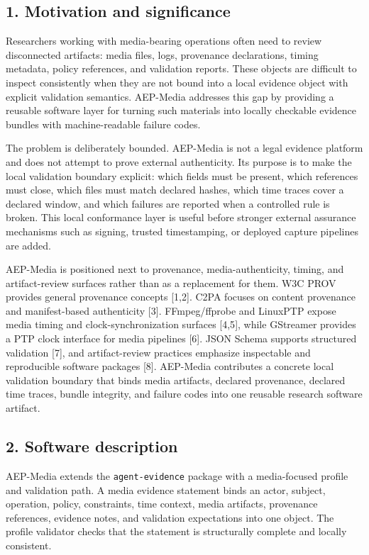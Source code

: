 \documentclass[
]{article}
\begin{document}
\subsection{1. Motivation and
significance}\label{motivation-and-significance}

Researchers working with media-bearing operations often need to review
disconnected artifacts: media files, logs, provenance declarations,
timing metadata, policy references, and validation reports. These
objects are difficult to inspect consistently when they are not bound
into a local evidence object with explicit validation semantics.
AEP-Media addresses this gap by providing a reusable software layer for
turning such materials into locally checkable evidence bundles with
machine-readable failure codes.

The problem is deliberately bounded. AEP-Media is not a legal evidence
platform and does not attempt to prove external authenticity. Its
purpose is to make the local validation boundary explicit: which fields
must be present, which references must close, which files must match
declared hashes, which time traces cover a declared window, and which
failures are reported when a controlled rule is broken. This local
conformance layer is useful before stronger external assurance
mechanisms such as signing, trusted timestamping, or deployed capture
pipelines are added.

AEP-Media is positioned next to provenance, media-authenticity, timing,
and artifact-review surfaces rather than as a replacement for them. W3C
PROV provides general provenance concepts {[}1,2{]}. C2PA focuses on
content provenance and manifest-based authenticity {[}3{]}.
FFmpeg/ffprobe and LinuxPTP expose media timing and
clock-synchronization surfaces {[}4,5{]}, while GStreamer provides a PTP
clock interface for media pipelines {[}6{]}. JSON Schema supports
structured validation {[}7{]}, and artifact-review practices emphasize
inspectable and reproducible software packages {[}8{]}. AEP-Media
contributes a concrete local validation boundary that binds media
artifacts, declared provenance, declared time traces, bundle integrity,
and failure codes into one reusable research software artifact.

\subsection{2. Software description}\label{software-description}

AEP-Media extends the \texttt{agent-evidence} package with a
media-focused profile and validation path. A media evidence statement
binds an actor, subject, operation, policy, constraints, time context,
media artifacts, provenance references, evidence notes, and validation
expectations into one object. The profile validator checks that the
statement is structurally complete and locally consistent.
\end{document}
